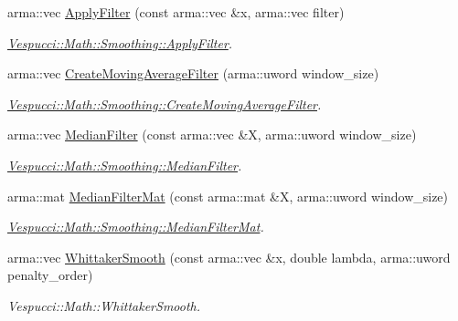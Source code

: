 \begin{DoxyCompactItemize}
arma\+::vec \hyperlink{namespace_vespucci_1_1_math_1_1_smoothing_ae7edb32bb2b859965dae5626b829e0cf}{Apply\+Filter} (const arma\+::vec \&x, arma\+::vec filter)
\begin{DoxyCompactList}\small\item\em \hyperlink{namespace_vespucci_1_1_math_1_1_smoothing_aa38f2ef278486993ec066ff5701bec62}{Vespucci\+::\+Math\+::\+Smoothing\+::\+Apply\+Filter}. \end{DoxyCompactList}\item 
arma\+::vec \hyperlink{namespace_vespucci_1_1_math_1_1_smoothing_a611221f749d15133ad90da3ba3bbca73}{Create\+Moving\+Average\+Filter} (arma\+::uword window\+\_\+size)
\begin{DoxyCompactList}\small\item\em \hyperlink{namespace_vespucci_1_1_math_1_1_smoothing_a611221f749d15133ad90da3ba3bbca73}{Vespucci\+::\+Math\+::\+Smoothing\+::\+Create\+Moving\+Average\+Filter}. \end{DoxyCompactList}\item 
arma\+::vec \hyperlink{namespace_vespucci_1_1_math_1_1_smoothing_a5456df71022c23baab4c51988866656e}{Median\+Filter} (const arma\+::vec \&X, arma\+::uword window\+\_\+size)
\begin{DoxyCompactList}\small\item\em \hyperlink{namespace_vespucci_1_1_math_1_1_smoothing_a5456df71022c23baab4c51988866656e}{Vespucci\+::\+Math\+::\+Smoothing\+::\+Median\+Filter}. \end{DoxyCompactList}\item 
arma\+::mat \hyperlink{namespace_vespucci_1_1_math_1_1_smoothing_a2b168115738d2931e0a5504823b26b3b}{Median\+Filter\+Mat} (const arma\+::mat \&X, arma\+::uword window\+\_\+size)
\begin{DoxyCompactList}\small\item\em \hyperlink{namespace_vespucci_1_1_math_1_1_smoothing_a2b168115738d2931e0a5504823b26b3b}{Vespucci\+::\+Math\+::\+Smoothing\+::\+Median\+Filter\+Mat}. \end{DoxyCompactList}\item 
arma\+::vec \hyperlink{namespace_vespucci_1_1_math_1_1_smoothing_ab92bb85566a363c2c54ad77d4eb2468f}{Whittaker\+Smooth} (const arma\+::vec \&x, double lambda, arma\+::uword penalty\+\_\+order)
\begin{DoxyCompactList}\small\item\em Vespucci\+::\+Math\+::\+Whittaker\+Smooth. \end{DoxyCompactList}\end{DoxyCompactItemize}


